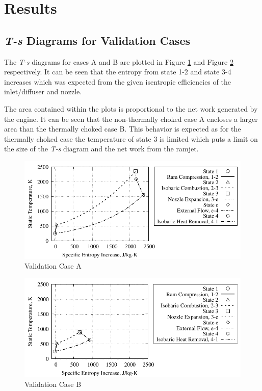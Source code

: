 \documentclass[conf]{new-aiaa} %
\begin{document}
\section{Results} \label{sec:results}
\subsection{\textit{T-s} Diagrams for Validation Cases} \label{sec:resultsparta} %
The \textit{T-s} diagrams for cases A and B are plotted in Figure \ref{fig:partavalida} and Figure \ref{fig:partavalidb} respectively. It can be seen that the entropy from state 1-2 and state 3-4 increases which was expected from the given isentropic efficiencies of the inlet/diffuser and nozzle.

The area contained within the plots is proportional to the net work generated by the engine. It can be seen that the non-thermally choked case A encloses a larger area than the thermally choked case B. This behavior is expected as for the thermally choked case the temperature of state 3 is limited which puts a limit on the size of the \textit{T-s} diagram and the net work from the ramjet.

\begin{figure}[H] %
    \centering
    \includegraphics[]{media/ts_plot_files/TS_plot_for_case_7.pdf}
    \caption{\label{fig:partavalida}Validation Case A}
\end{figure}

\begin{figure}[H] %
    \centering
    \includegraphics[]{media/ts_plot_files/TS_plot_for_case_8.pdf}
    \caption{\label{fig:partavalidb}Validation Case B}
\end{figure}
\end{document}
